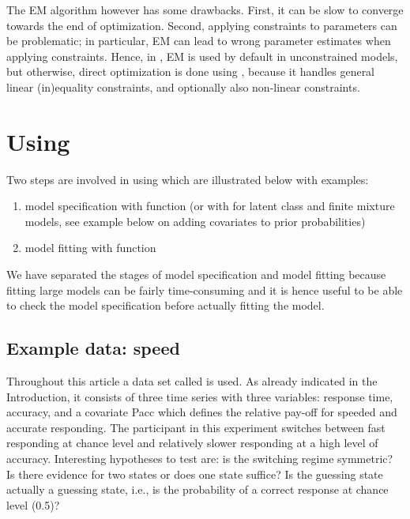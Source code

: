 \documentclass[article]{jss}
\begin{document}
The EM algorithm however has some drawbacks.  First, it can be slow to
converge towards the end of optimization.  Second,
applying constraints to parameters can be problematic; in particular,
EM can lead to wrong parameter estimates when applying constraints.
Hence, in , EM is used by default in unconstrained
models, but otherwise, direct optimization is done using 
\citep{Tamura2009,Spellucci2002}, because it handles general linear
(in)equality constraints, and optionally also non-linear constraints.




\section[Using depmixS4]{Using }

Two steps are involved in using  which are illustrated
below with examples:
\begin{enumerate}
	\item model specification with function  (or with 
	for latent class and finite mixture models, see example below on adding
	covariates to prior probabilities)
	
	\item  model fitting with function 
\end{enumerate}
We have separated the stages of model specification and model fitting because
fitting large models can be fairly time-consuming and it is hence useful to be
able to check the model specification before actually fitting the model. 

\subsection{Example data: speed}

Throughout this article a data set called  is used.  As already 
indicated in the Introduction, it
consists of three time series with three variables: response time,
accuracy, and a covariate Pacc which defines the relative pay-off for
speeded and accurate responding.  The participant in this experiment
switches between fast responding at chance level and relatively slower
responding at a high level of accuracy.  Interesting hypotheses to
test are: is the switching regime symmetric?  Is there evidence for
two states or does one state suffice?  Is the guessing state actually
a guessing state, i.e., is the probability of a correct response at
chance level (0.5)?
\end{document}
